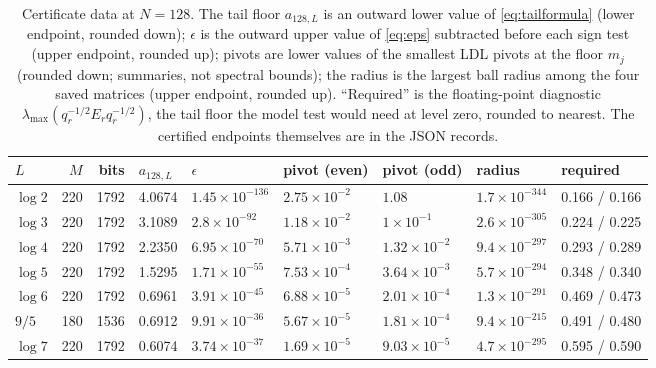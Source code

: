 \begin{table}[ht]
\centering
\caption{Certificate data at $N=128$. The tail floor $a_{128,L}$ is an outward lower value of \eqref{eq:tailformula} (lower endpoint, rounded down); $\epsilon$ is the outward upper value of \eqref{eq:eps} subtracted before each sign test (upper endpoint, rounded up); pivots are lower values of the smallest LDL pivots at the floor $m_j$ (rounded down; summaries, not spectral bounds); the radius is the largest ball radius among the four saved matrices (upper endpoint, rounded up). ``Required'' is the floating-point diagnostic $\lambda_{\max}(q_r^{-1/2}E_rq_r^{-1/2})$, the tail floor the model test would need at level zero, rounded to nearest. The certified endpoints themselves are in the JSON records.}
\label{tab:certificate}
\footnotesize\setlength{\tabcolsep}{3.5pt}
\begin{tabular}{@{}lrrllllll@{}}
\toprule
$L$ & $M$ & bits & $a_{128,L}$ & $\epsilon$ & pivot (even) & pivot (odd) & radius & required\\
\midrule
$\log2$ & 220 & 1792 & 4.0674 & $1.45\times10^{-136}$ & $2.75\times10^{-2}$ & $1.08$ & $1.7\times10^{-344}$ & 0.166 / 0.166\\
$\log3$ & 220 & 1792 & 3.1089 & $2.8\times10^{-92}$ & $1.18\times10^{-2}$ & $1\times10^{-1}$ & $2.6\times10^{-305}$ & 0.224 / 0.225\\
$\log4$ & 220 & 1792 & 2.2350 & $6.95\times10^{-70}$ & $5.71\times10^{-3}$ & $1.32\times10^{-2}$ & $9.4\times10^{-297}$ & 0.293 / 0.289\\
$\log5$ & 220 & 1792 & 1.5295 & $1.71\times10^{-55}$ & $7.53\times10^{-4}$ & $3.64\times10^{-3}$ & $5.7\times10^{-294}$ & 0.348 / 0.340\\
$\log6$ & 220 & 1792 & 0.6961 & $3.91\times10^{-45}$ & $6.88\times10^{-5}$ & $2.01\times10^{-4}$ & $1.3\times10^{-291}$ & 0.469 / 0.473\\
$9/5$ & 180 & 1536 & 0.6912 & $9.91\times10^{-36}$ & $5.67\times10^{-5}$ & $1.81\times10^{-4}$ & $9.4\times10^{-215}$ & 0.491 / 0.480\\
$\log7$ & 220 & 1792 & 0.6074 & $3.74\times10^{-37}$ & $1.69\times10^{-5}$ & $9.03\times10^{-5}$ & $4.7\times10^{-295}$ & 0.595 / 0.590\\
\bottomrule
\end{tabular}
\end{table}
